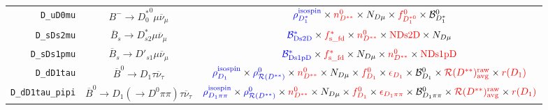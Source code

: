 \begin{landscape}
\begin{table}
\begin{tabular}{r|c|c}
        \texttt{D\_uD0mu} &                  $B^- \rightarrow {D^*_0}^0 \mu \overline{\nu}_\mu$                  &                                                                                                     $\textcolor{blue}{\rho^\text{isospin}_{D_1^*}} \times \textcolor{red}{n^{0}_{D^{**}}} \times N_{D \mu} \times \textcolor{red}{f^{0}_{D_1^{*0}}} \times \mathcal{B}^{0}_{D_1^*}$                                                                                                      \\
       \texttt{D\_sDs2mu} &             $\overline{B}_s \rightarrow D_{s2}^* \mu \overline{\nu}_\mu$             &                                                                                                 $\textcolor{blue}{\mathcal{B}^{*}_\text{Ds2D}} \times \textcolor{red}{f^{*}_\text{s\_fd}} \times \textcolor{red}{n^{0}_{D^{**}}} \times \textcolor{red}{\text{NDs2D}} \times N_{D \mu}$                                                                                                  \\
      \texttt{D\_sDs1pmu} &             $\overline{B}_s \rightarrow D'_{s1} \mu \overline{\nu}_\mu$              &                                                                                                $\textcolor{blue}{\mathcal{B}^{*}_\text{Ds1pD}} \times \textcolor{red}{f^{*}_\text{s\_fd}} \times N_{D \mu} \times \textcolor{red}{n^{0}_{D^{**}}} \times \textcolor{red}{\text{NDs1pD}}$                                                                                                 \\
       \texttt{D\_dD1tau} &              $\overline{B}^0 \rightarrow D_1 \tau \overline{\nu}_\tau$               &          $\textcolor{blue}{\rho^\text{isospin}_{D_1}} \times \textcolor{blue}{\rho_{\mathcal{R}(D^{**})}^0} \times \textcolor{red}{n^{0}_{D^{**}}} \times N_{D \mu} \times \textcolor{red}{f^{0}_{D_1}} \times \textcolor{red}{\epsilon_{D_1}} \times \mathcal{B}^{0}_{D_1} \times \textcolor{red}{\mathcal{R}(D^{**})_\text{avg}^\text{raw}} \times \textcolor{red}{r({D_1})}$          \\
 \texttt{D\_dD1tau\_pipi} &  $\overline{B}^0 \rightarrow D_1 (\rightarrow D^0 \pi\pi) \tau \overline{\nu}_\tau$  & $\textcolor{blue}{\rho^\text{isospin}_{D_1\pi\pi}} \times \textcolor{blue}{\rho_{\mathcal{R}(D^{**})}^0} \times \textcolor{red}{n^{0}_{D^{**}}} \times N_{D \mu} \times \textcolor{red}{f^{0}_{D_1}} \times \textcolor{red}{\epsilon_{D_1\pi\pi}} \times \mathcal{B}^{0}_{D_1\pi\pi} \times \textcolor{red}{\mathcal{R}(D^{**})_\text{avg}^\text{raw}} \times \textcolor{red}{r({D_1})}$ \\

\end{tabular}
\end{table}
\end{landscape}
